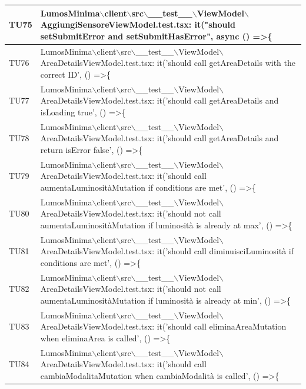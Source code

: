 \documentclass[12pt]{article}
\begin{document}
\begin{xltabular}{\linewidth}{|>{\hsize}X|X|}
	TU75 & LumosMinima$\backslash$client$\backslash$src$\backslash$\_\_test\_\_$\backslash$ViewModel$\backslash$AggiungiSensoreViewModel.test.tsx: it("should setSubmitError and setSubmitHasError", async () =\textgreater \{ \\ \hline
	TU76 & LumosMinima$\backslash$client$\backslash$src$\backslash$\_\_test\_\_$\backslash$ViewModel$\backslash$AreaDetailsViewModel.test.tsx: it('should call getAreaDetails with the correct ID', () =\textgreater \{ \\ \hline
	TU77 & LumosMinima$\backslash$client$\backslash$src$\backslash$\_\_test\_\_$\backslash$ViewModel$\backslash$AreaDetailsViewModel.test.tsx: it('should call getAreaDetails and isLoading true', () =\textgreater \{ \\ \hline
	TU78 & LumosMinima$\backslash$client$\backslash$src$\backslash$\_\_test\_\_$\backslash$ViewModel$\backslash$AreaDetailsViewModel.test.tsx: it('should call getAreaDetails and return isError false', () =\textgreater \{ \\ \hline
	TU79 & LumosMinima$\backslash$client$\backslash$src$\backslash$\_\_test\_\_$\backslash$ViewModel$\backslash$AreaDetailsViewModel.test.tsx: it('should call aumentaLuminositàMutation if conditions are met', () =\textgreater \{ \\ \hline
	TU80 & LumosMinima$\backslash$client$\backslash$src$\backslash$\_\_test\_\_$\backslash$ViewModel$\backslash$AreaDetailsViewModel.test.tsx: it('should not call aumentaLuminositàMutation if luminosità is already at max', () =\textgreater \{ \\ \hline
	TU81 & LumosMinima$\backslash$client$\backslash$src$\backslash$\_\_test\_\_$\backslash$ViewModel$\backslash$AreaDetailsViewModel.test.tsx: it('should call diminuisciLuminosità if conditions are met', () =\textgreater \{ \\ \hline
	TU82 & LumosMinima$\backslash$client$\backslash$src$\backslash$\_\_test\_\_$\backslash$ViewModel$\backslash$AreaDetailsViewModel.test.tsx: it('should not call aumentaLuminositàMutation if luminosità is already at min', () =\textgreater \{ \\ \hline
	TU83 & LumosMinima$\backslash$client$\backslash$src$\backslash$\_\_test\_\_$\backslash$ViewModel$\backslash$AreaDetailsViewModel.test.tsx: it('should call eliminaAreaMutation when eliminaArea is called', () =\textgreater \{ \\ \hline
	TU84 & LumosMinima$\backslash$client$\backslash$src$\backslash$\_\_test\_\_$\backslash$ViewModel$\backslash$AreaDetailsViewModel.test.tsx: it('should call cambiaModalitaMutation when cambiaModalità is called', () =\textgreater \{ \\ \hline

\end{xltabular}
\end{document}
